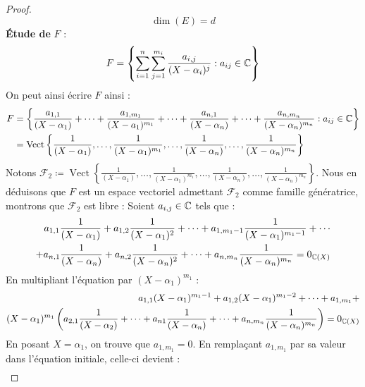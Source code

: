 \begin{proof}
    \[ \dim(E) = d \]
    \textbf{\'Etude de} $F$ :
    \[ F = \left\{ \sum_{i = 1}^{n} \sum_{j = 1}^{m_i} \frac{a_{i, j}}{(X - \alpha_i)^{j}} : a_{ij} \in \mathbb{C} \right\} \]
    On peut ainsi écrire $F$ ainsi : 
    \begin{align*}
        F &= \left\{ \frac{a_{1, 1}}{(X - \alpha_1)} + \cdots + \frac{a_{1, m_1}}{(X - a_1)^{m_1}} + \cdots + \frac{a_{n, 1}}{(X - \alpha_n)} + \cdots + \frac{a_{n, m_n}}{(X - \alpha_n)^{m_n}} : a_{ij} \in \mathbb{C} \right\} \\
        &= \operatorname{Vect} \left\{ \frac{1}{(X - \alpha_1)}, \ldots, \frac{1}{(X - \alpha_1)^{m_1}}, \ldots, \frac{1}{(X - \alpha_n)}, \ldots, \frac{1}{(X - \alpha_n)^{m_n}}  \right\}
    \end{align*}
    Notons $\mathcal{F}_2 \coloneqq \operatorname{Vect} \left\{ \frac{1}{(X - \alpha_1)}, \ldots, \frac{1}{(X - \alpha_1)^{m_1}}, \ldots, \frac{1}{(X - \alpha_n)}, \ldots, \frac{1}{(X - \alpha_n)^{m_n}}  \right\}$. Nous en déduisons que $F$ est un espace vectoriel admettant $\mathcal{F}_2$ comme famille génératrice, montrons que $\mathcal{F}_2$ est libre : Soient $a_{i,j} \in \mathbb{C}$ tels que :
    \begin{align*}
        \begin{split}
            a_{1,1} \frac{1}{(X - \alpha_1)} + a_{1,2} \frac{1}{(X - \alpha_1)^2} + \cdots + a_{1,m_1-1} \frac{1}{(X - \alpha_1)^{m_1 - 1}} + \cdots \\
            + a_{n,1} \frac{1}{(X - \alpha_n)} + a_{n,2} \frac{1}{(X - \alpha_n)^2} + \cdots + a_{n,m_n} \frac{1}{(X - \alpha_n)^{m_n}} = 0_{\mathbb{C}(X)}
        \end{split}
    \end{align*}
    En multipliant l'équation par $(X - \alpha_1)^{m_1}$ :
    \begin{align*}
        \begin{split}
            a_{1,1} (X - \alpha_1)^{m_1 - 1} + a_{1,2} (X - \alpha_1)^{m_1 - 2} + \cdots + a_{1,m_1} + \\
            (X - \alpha_1)^{m_1}
            \left( 
            a_{2,1} \frac{1}{(X - \alpha_2)} + \cdots + a_{n1} \frac{1}{(X - \alpha_n)} + \cdots + a_{n,m_n} \frac{1}{(X - \alpha_n)^{m_n}}
            \right)
            = 0_{\mathbb{C}(X)}
         \end{split}
    \end{align*}
    En posant $X = \alpha_1$, on trouve que $a_{1,m_1} = 0$.
    En remplaçant $a_{1,m_1}$ par sa valeur dans l'équation initiale, celle-ci devient : 
    \begin{align*}

\end{align*}
\end{proof}

